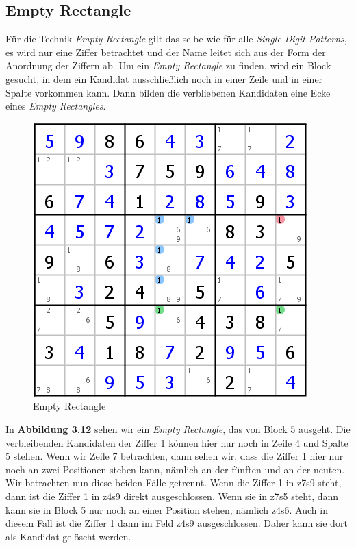 \newpage
\subsection{Empty Rectangle}
Für die Technik \textit{Empty Rectangle} gilt das selbe wie für alle \textit{Single Digit Patterns}, es wird nur eine Ziffer betrachtet und der Name leitet sich aus der Form der Anordnung der Ziffern ab. Um ein \textit{Empty Rectangle} zu finden, wird ein Block gesucht, in dem ein Kandidat ausschließlich noch in einer Zeile und in einer Spalte vorkommen kann. Dann bilden die verbliebenen Kandidaten eine Ecke eines \textit{Empty Rectangles}.

\begin{figure}[h]
\begin{center}
\includegraphics{./img/empty_rectangle.png}
\caption{Empty Rectangle}
\end{center}
\end{figure}

In \textbf{Abbildung 3.12} sehen wir ein \textit{Empty Rectangle}, das von Block 5 ausgeht. Die verbleibenden Kandidaten der Ziffer 1 können hier nur noch in Zeile 4 und Spalte 5 stehen. Wenn wir Zeile 7 betrachten, dann sehen wir, dass die Ziffer 1 hier nur noch an zwei Positionen stehen kann, nämlich an der fünften und an der neuten. Wir betrachten nun diese beiden Fälle getrennt. Wenn die Ziffer 1 in z7s9 steht, dann ist die Ziffer 1 in z4s9 direkt ausgeschlossen. Wenn sie in z7s5 steht, dann kann sie in Block 5 nur noch an einer Position stehen, nämlich z4s6. Auch in diesem Fall ist die Ziffer 1 dann im Feld z4s9 ausgeschlossen. Daher kann sie dort als Kandidat gelöscht werden.